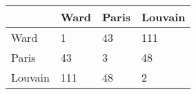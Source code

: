 \begin{tabular}{llll}
\toprule
{} & Ward & Paris & Louvain \\
\midrule
Ward    &    1 &    43 &     111 \\
Paris   &   43 &     3 &      48 \\
Louvain &  111 &    48 &       2 \\
\bottomrule
\end{tabular}
